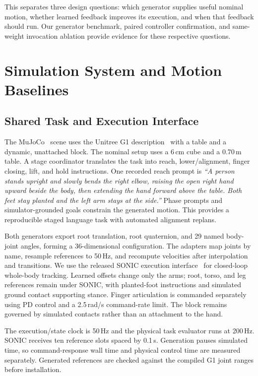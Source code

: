 \documentclass[letterpaper,10pt,conference]{ieeeconf}
\begin{document}
This separates three design questions: which generator supplies useful nominal motion, whether learned feedback improves its execution, and when that feedback should run. Our generator benchmark, paired controller confirmation, and same-weight invocation ablation provide evidence for these respective questions.

\section{Simulation System and Motion Baselines}


\subsection{Shared Task and Execution Interface}
The MuJoCo~\cite{mujoco} scene uses the Unitree G1 description~\cite{unitree_g1} with a table and a dynamic, unattached block. The nominal setup uses a 6\,cm cube and a 0.70\,m table. A stage coordinator translates the task into reach, lower/alignment, finger closing, lift, and hold instructions. One recorded reach prompt is \emph{``A person stands upright and slowly bends the right elbow, raising the open right hand upward beside the body, then extending the hand forward above the table. Both feet stay planted and the left arm stays at the side.''} Phase prompts and simulator-grounded goals constrain the generated motion. This provides a reproducible staged language task with automated alignment replans.

Both generators export root translation, root quaternion, and 29 named body-joint angles, forming a 36-dimensional configuration. The adapters map joints by name, resample references to 50\,Hz, and recompute velocities after interpolation and transitions. We use the released SONIC execution interface~\cite{sonic_software} for closed-loop whole-body tracking. Learned offsets change only the arms; root, torso, and leg references remain under SONIC, with planted-foot instructions and simulated ground contact supporting stance. Finger articulation is commanded separately using PD control and a 2.5\,rad/s command-rate limit. The block remains governed by simulated contacts rather than an attachment to the hand.

The execution/state clock is 50\,Hz and the physical task evaluator runs at 200\,Hz. SONIC receives ten reference slots spaced by 0.1\,s. Generation pauses simulated time, so command-response wall time and physical control time are measured separately. Generated references are checked against the compiled G1 joint ranges before installation.
\end{document}
